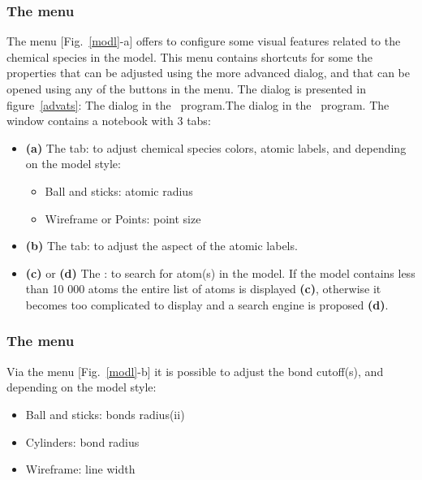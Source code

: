 \clearpage

\subsubsection{The  menu}

The  menu [Fig.~\ref{modl}-a] offers to configure some visual features related to the chemical species in the model. 
This menu contains shortcuts for some the properties that can be adjusted using the more advanced  dialog, 
and that can be opened using any of the  buttons in the menu. 
The  dialog is presented in figure~\ref{advats}:
{The  dialog in the \atomes\ program.}{The  dialog in the \atomes\ program.}
\laf The window contains a notebook with 3 tabs:
\begin{itemize}
\item {\bf{(a)}} The  tab: to adjust chemical species colors, atomic labels, and depending on the model style: 
\begin{itemize}
\item Ball and sticks: atomic radius
\item Wireframe or Points: point size
\end{itemize}   
\item {\bf{(b)}} The  tab: to adjust the aspect of the atomic labels.
\item {\bf{(c)}} or {\bf{(d)}} The : to search for atom(s) in the model. 
If the model contains less than 10 000 atoms the entire list of atoms is displayed {\bf{(c)}}, 
otherwise it becomes too complicated to display and a search engine is proposed {\bf{(d)}}.
\end{itemize}

\clearpage

\subsubsection{The  menu}  

Via the  menu [Fig.~\ref{modl}-b] it is possible to adjust the bond cutoff(s), and depending on the model style:
\begin{itemize}
\item Ball and sticks: bonds radius(ii)
\item Cylinders: bond radius
\item Wireframe: line width
\end{itemize}

